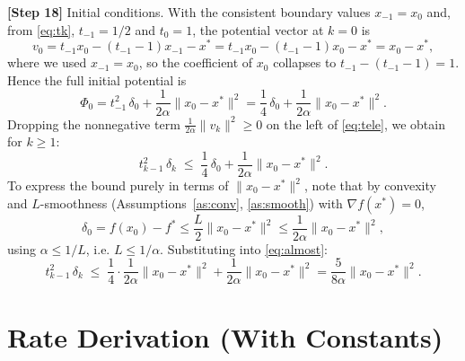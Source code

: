 \documentclass{article}
\begin{document}
\textbf{[Step 18]} Initial conditions. With the consistent boundary values
$x_{-1}=x_0$ and, from \eqref{eq:tk}, $t_{-1}=1/2$ and $t_0=1$, the potential
vector at $k=0$ is
\[
v_0 = t_{-1}x_0 - (t_{-1}-1)x_{-1} - x^*
    = t_{-1}x_0 - (t_{-1}-1)x_0 - x^*
    = x_0 - x^*,
\]
where we used $x_{-1}=x_0$, so the coefficient of $x_0$ collapses to
$t_{-1} - (t_{-1}-1) = 1$. Hence the full initial potential is
\[
\Phi_0 = t_{-1}^2\,\delta_0 + \frac{1}{2\alpha}\|x_0 - x^*\|^2
       = \frac14\,\delta_0 + \frac{1}{2\alpha}\|x_0 - x^*\|^2.
\]
Dropping the nonnegative term $\frac{1}{2\alpha}\|v_k\|^2 \ge 0$ on the left of
\eqref{eq:tele}, we obtain for $k \ge 1$:
\begin{equation}
t_{k-1}^2\,\delta_k
\;\le\;
\frac14\,\delta_0 + \frac{1}{2\alpha}\|x_0 - x^*\|^2. \label{eq:almost}
\end{equation}
To express the bound purely in terms of $\|x_0-x^*\|^2$, note that by convexity
and $L$-smoothness (Assumptions~\ref{as:conv}, \ref{as:smooth}) with
$\nabla f(x^*)=0$,
\[
\delta_0 = f(x_0) - f^* \le \frac{L}{2}\|x_0 - x^*\|^2
        \le \frac{1}{2\alpha}\|x_0 - x^*\|^2,
\]
using $\alpha \le 1/L$, i.e. $L \le 1/\alpha$. Substituting into
\eqref{eq:almost}:
\begin{equation}
t_{k-1}^2\,\delta_k
\;\le\;
\frac14\cdot\frac{1}{2\alpha}\|x_0-x^*\|^2 + \frac{1}{2\alpha}\|x_0 - x^*\|^2
= \frac{5}{8\alpha}\|x_0 - x^*\|^2. \label{eq:almost2}
\end{equation}

\section*{Rate Derivation (With Constants)}
\end{document}
